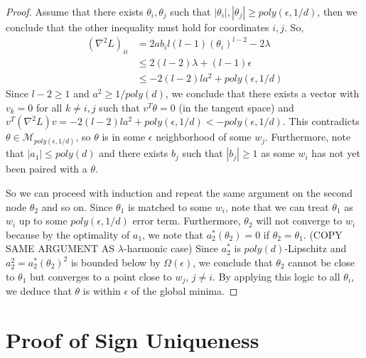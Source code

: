 \documentclass{article}
\begin{document}
\begin{proof}
Assume that there exists $\theta_i, \theta_j$ such that $|\theta_i|,|\theta_j| \geq poly(\epsilon,1/d)$, then we conclude that the other inequality must hold for coordinates $i, j$. So,
%
\begin{align*}
(\nabla^2 L)_{ii} & = 2a b_i l(l-1)(\theta_i)^{l-2} - 2 \lambda \\
& \leq
  2(l-2)\lambda + (l-1)\epsilon \\
&  \leq -2(l-2)la^2 + poly(\epsilon,1/d)
\end{align*}
%
Since $l-2 \geq 1$ and $a^2 \geq 1/poly(d)$, we conclude that there
exists a vector with $v_k = 0$ for all $k\neq i, j$ such that
$v^T\theta = 0$ (in the tangent space) and
$v^T(\nabla^2 L) v = -2(l-2)l a^2 + poly(\epsilon,1/d) <
-poly(\epsilon,1/d)$.
This contradicts $\theta \in \mathcal{M}_{poly(\epsilon,1/d)}$, so
$\theta$ is in some $\epsilon$ neighborhood of some
$w_j$. Furthermore, note that $|a_1| \leq poly(d)$ and there exists
$b_j$ such that $|b_j| \geq 1$ as some $w_i$ has not yet been paired
with a $\theta$.

So we can proceed with induction and repeat the same argument on the second node $\theta_2$ and so on. Since $\theta_1$ is matched to some $w_i$, note that we can treat $\theta_1$ as $w_i$ up to some $poly(\epsilon,1/d)$ error term. Furthermore, $\theta_2$ will not converge to $w_i$ because by the optimality 
of $a_1$, we note that $a_2^*(\theta_2) = 0$ if $\theta_2 =\theta_1$. (COPY SAME ARGUMENT AS $\lambda$-harmonic case) Since $a_2^*$ is $poly(d)$-Lipschitz and $a_2^2 = a_2^*(\theta_2)^2$ is bounded below by $\Omega(\epsilon)$, we conclude that $\theta_2$ cannot be close to $\theta_1$ but converges to a point close to $w_{j}$, $j\neq i$. By applying this logic to all $\theta_i$, we deduce that $\theta$ is within $\epsilon$ of the global minima.
\end{proof}


\section{Proof of Sign Uniqueness}


\end{document}

